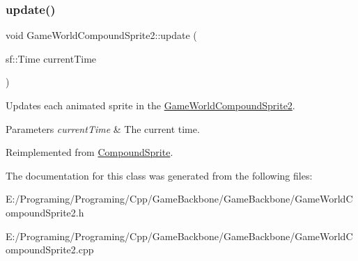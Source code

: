 \subsubsection{\texorpdfstring{update()}{update()}}
{\footnotesize\ttfamily void Game\+World\+Compound\+Sprite2\+::update (\begin{DoxyParamCaption}\item[{sf\+::\+Time}]{current\+Time }\end{DoxyParamCaption})\hspace{0.3cm}{\ttfamily [virtual]}}



Updates each animated sprite in the \hyperlink{class_game_world_compound_sprite2}{Game\+World\+Compound\+Sprite2}. 


\begin{DoxyParams}{Parameters}
{\em current\+Time} & The current time.\\
\hline
\end{DoxyParams}


Reimplemented from \hyperlink{class_compound_sprite_a0761cc2bdded00f203db7e4c6d02aa6c}{Compound\+Sprite}.



The documentation for this class was generated from the following files\+:\begin{DoxyCompactItemize}
\item 
E\+:/\+Programing/\+Programing/\+Cpp/\+Game\+Backbone/\+Game\+Backbone/Game\+World\+Compound\+Sprite2.\+h\item 
E\+:/\+Programing/\+Programing/\+Cpp/\+Game\+Backbone/\+Game\+Backbone/Game\+World\+Compound\+Sprite2.\+cpp\end{DoxyCompactItemize}
